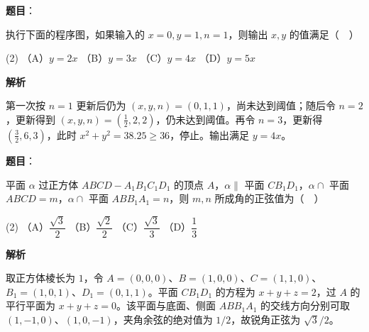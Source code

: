 \begin{answer}

\textbf{题目}：

执行下面的程序图，如果输入的 \(x=0,y=1,n=1\)，则输出 \(x,y\) 的值满足（　）
\nopagebreak[4]
\begin{center}\end{center}
\nopagebreak[4]
\begin{gkopts}(2)
\task （A）\(y=2x\)
\task （B）\(y=3x\)
\task （C）\(y=4x\)
\task （D）\(y=5x\)
\end{gkopts}

\textbf{解析}

第一次按 \(n=1\) 更新后仍为 \((x,y,n)=(0,1,1)\)，尚未达到阈值；随后令 \(n=2\)，更新得到 \((x,y,n)=(\frac12,2,2)\)，仍未达到阈值。再令 \(n=3\)，更新得 \((\frac32,6,3)\)，此时 \(x^2+y^2=38.25\ge36\)，停止。输出满足 \(y=4x\)。


\end{answer}
\begin{answer}

\textbf{题目}：

平面 \(\alpha\) 过正方体 \(ABCD-A_1B_1C_1D_1\) 的顶点 \(A\)，\(\alpha\parallel\) 平面 \(CB_1D_1\)，\(\alpha\cap\) 平面 \(ABCD=m\)，\(\alpha\cap\) 平面 \(ABB_1A_1=n\)，则 \(m,n\) 所成角的正弦值为（　）

\begin{gkopts}(2)
\task （A）\(\dfrac{\sqrt{3}}{2}\)
\task （B）\(\dfrac{\sqrt{2}}{2}\)
\task （C）\(\dfrac{\sqrt{3}}{3}\)
\task （D）\(\dfrac{1}{3}\)
\end{gkopts}

\textbf{解析}

取正方体棱长为 \(1\)，令 \(A=(0,0,0)\)、\(B=(1,0,0)\)、\(C=(1,1,0)\)、\(B_1=(1,0,1)\)、\(D_1=(0,1,1)\)。平面 \(CB_1D_1\) 的方程为 \(x+y+z=2\)，过 \(A\) 的平行平面为 \(x+y+z=0\)。该平面与底面、侧面 \(ABB_1A_1\) 的交线方向分别可取 \((1,-1,0)\)、\((1,0,-1)\)，夹角余弦的绝对值为 \(1/2\)，故锐角正弦为 \(\sqrt3/2\)。


\end{answer}
